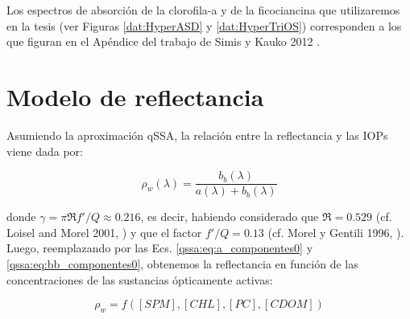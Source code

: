         Los espectros de absorción de la clorofila-a y de la ficociancina que utilizaremos en la tesis (ver Figuras \ref{dat:HyperASD} y \ref{dat:HyperTriOS}) corresponden a los que figuran en el Apéndice del trabajo de Simis y Kauko 2012 \cite{simis2012}.

\section{Modelo de reflectancia}
\label{qssa:s:qssa}

    Asumiendo la aproximación qSSA, la relación entre la reflectancia y las IOPs viene dada por:

    \begin{equation}
        \rho_{w}(\lambda) = 
        \frac{b_{b}(\lambda)}{a(\lambda) + b_{b}(\lambda)}
        \label{qssa:eq:rhowmod0}
    \end{equation}

    \noindent donde $\gamma = \pi \Re f'/Q \approx 0.216$, es decir, habiendo considerado que $\Re = 0.529$ (cf. Loisel and Morel 2001, \cite{loisel2001}) y que el factor $f'/Q = 0.13$ (cf. Morel y Gentili 1996, \cite{morel1996}). Luego, reemplazando por las Ecs. \ref{qssa:eq:a_componentes0} y \ref{qssa:eq:bb_componentes0}, obtenemos la reflectancia en función de las concentraciones de las sustancias ópticamente activas:
    
    \begin{equation}
        \rho_{w} = f([SPM],[CHL],[PC],[CDOM])
        \label{qssa:eq:rhowmod}
    \end{equation}